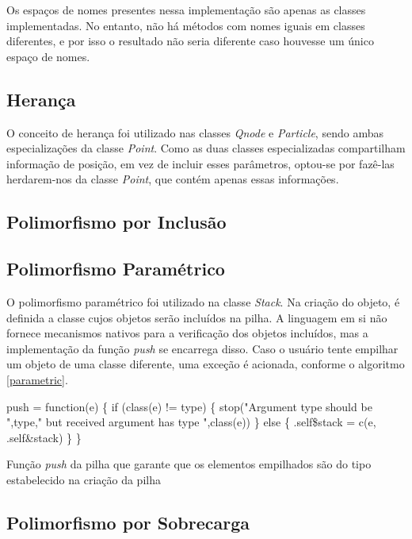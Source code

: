 \documentclass[rel_mlp]{iiufrgs}
\makeatletter
\newcommand{\nosemic}{\renewcommand{\@endalgocfline}{\relax}}%
\makeatother
\begin{document}
    Os espaços de nomes presentes nessa implementação são apenas as classes implementadas. No entanto,
    não há métodos com nomes iguais em classes diferentes, e por isso o resultado não seria diferente
    caso houvesse um único espaço de nomes.

\subsection{Herança}

    O conceito de herança foi utilizado nas classes \textit{Qnode} e \textit{Particle}, sendo ambas
    especializações da classe \textit{Point}. Como as duas classes especializadas compartilham informação
    de posição, em vez de incluir esses parâmetros, optou-se por fazê-las herdarem-nos da classe \textit{Point},
    que contém apenas essas informações.

\subsection{Polimorfismo por Inclusão}

\subsection{Polimorfismo Paramétrico}

    O polimorfismo paramétrico foi utilizado na classe \textit{Stack}. Na criação do objeto, é definida
    a classe cujos objetos serão incluídos na pilha. A linguagem em si não fornece mecanismos nativos para
    a verificação dos objetos incluídos, mas a implementação da função \textit{push} se encarrega disso. Caso
    o usuário tente empilhar um objeto de uma classe diferente, uma exceção é acionada, conforme o algoritmo
    \ref{parametric}.

    \begin{algorithm}
    \nosemic    push = function(e) {\{}
  if (class(e) != type) {\{}
    stop("Argument type should be ",type," but received argument has type ",class(e))
  {\}} else {\{}
    .self{\$}stack = c(e, .self{\&}stack)
  {\}}
{\}}
\caption{Função \textit{push} da pilha que garante que os elementos empilhados são do tipo estabelecido na criação da pilha}
\end{algorithm}

    \label{parametric}



\subsection{Polimorfismo por Sobrecarga}
\end{document}
